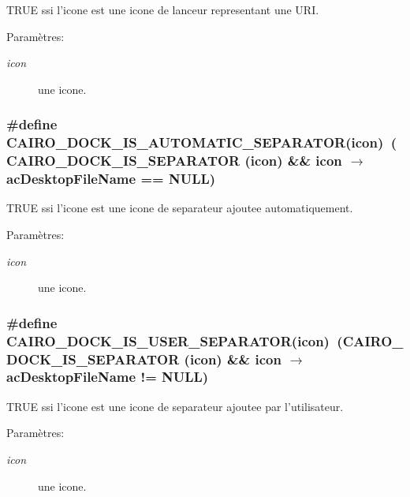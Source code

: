 TRUE ssi l'icone est une icone de lanceur representant une URI. \begin{Desc}
\item[Paramètres:]
\begin{description}
\item[{\em icon}]une icone. \end{description}
\end{Desc}
\subsubsection{\setlength{\rightskip}{0pt plus 5cm}\#define CAIRO\_\-DOCK\_\-IS\_\-AUTOMATIC\_\-SEPARATOR(icon)~(CAIRO\_\-DOCK\_\-IS\_\-SEPARATOR (icon) \&\& icon $\rightarrow$ acDesktopFileName == NULL)}\label{cairo-dock-icons_8h_0abf7855cd414ec53bca3154325c5012}


TRUE ssi l'icone est une icone de separateur ajoutee automatiquement. \begin{Desc}
\item[Paramètres:]
\begin{description}
\item[{\em icon}]une icone. \end{description}
\end{Desc}
\subsubsection{\setlength{\rightskip}{0pt plus 5cm}\#define CAIRO\_\-DOCK\_\-IS\_\-USER\_\-SEPARATOR(icon)~(CAIRO\_\-DOCK\_\-IS\_\-SEPARATOR (icon) \&\& icon $\rightarrow$ acDesktopFileName != NULL)}\label{cairo-dock-icons_8h_532a67abe9511660a5bfbf736e03d80d}


TRUE ssi l'icone est une icone de separateur ajoutee par l'utilisateur. \begin{Desc}
\item[Paramètres:]
\begin{description}
\item[{\em icon}]une icone. \end{description}
\end{Desc}
